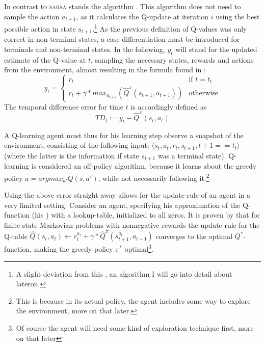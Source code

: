 In contrast to \textsc{sarsa} stands the  algorithm . This algorithm does not need to sample the action $a_{t+1}$, as it calculates the Q-update at iteration $i$ using the best possible action in state $s_{t+1}$.\footnote{A slight deviation from this , an algorithm I will go into detail about lateron.} As the previous definition of Q-values was only correct in non-terminal states, a case differentiation must be introduced for terminals and non-terminal states. In the following, $y_t$ will stand for the updated estimate of the Q-value at $t$, sampling the necessary states, rewards and actions from the environment, almost resulting in the formula found in \cite{mnih_human-level_2015}:
\begin{equation} \label{eq:ycases}
	y_{t} = \begin{cases} 
		r_t & \text{if } t = t_t\\
		r_t + \gamma * max_{a_{t+1}} (\hat{Q}^\pi( s_{t+1}, a_{t+1})) & \text{otherwise}
\end{cases}
\end{equation}
The temporal difference error for time $t$ is accordingly defined as 
\begin{equation}
TD_t := y_t - \hat{Q}^\pi(s_t, a_t)
\end{equation}

A Q-learning agent must thus for his learning step observe a snapshot of the environment, consisting of the following input: $\langle s_t, a_t, r_t, s_{t+1}, t+1==t_t \rangle$ (where the latter is the information if state $s_{t+1}$ was a terminal state). Q-learning is considered an off-policy algorithm, because it learns about the greedy policy $a=argmax_{a'}Q(s,a')$, while not necessarily following it.\footnote{This is because in its actual policy, the agent includes some way to explore the environment, more on that later.}

Using the above error straight away allows for the update-rule of an agent in a very limited setting: Consider an agent, specifying his approximation of the Q-function (his ) with a lookup-table, initialized to all zeros. It is proven by \cite{watkins_technical_1992} that for finite-state Markovian problems with nonnegative rewards the update-rule for the Q-table $\hat{Q}(s_t,a_t) \leftarrow r_t^{a_t} + \gamma * \hat{Q}^\pi(s_{t+1}^{a_t},a_{t+1}) $ converges to the optimal $Q^*$-function, making the greedy policy $\pi^*$ optimal\footnote{Of course the agent will need some kind of exploration technique first, more on that later}.  %

